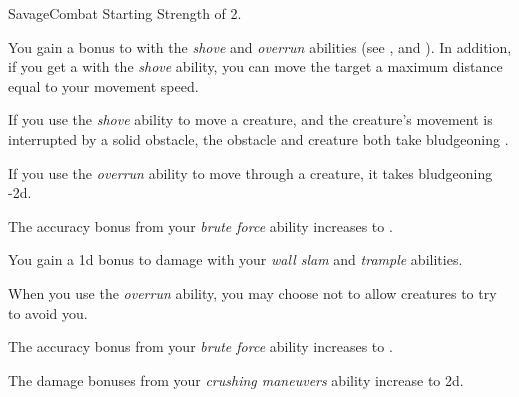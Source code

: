     \begin{feat}{Savage}{Combat}
        \featpre Starting Strength of 2.

         You gain a  bonus to  with the \textit{shove} and \textit{overrun} abilities (see , and ).
        In addition, if you get a  with the \textit{shove} ability, you can move the target a maximum distance equal to your movement speed.

         If you use the \textit{shove} ability to move a creature, and the creature's movement is interrupted by a solid obstacle, the obstacle and creature both take bludgeoning .

         If you use the \textit{overrun} ability to move through a creature, it takes bludgeoning  -2d.

         The accuracy bonus from your \textit{brute force} ability increases to .

         You gain a \plus1d bonus to damage with your \textit{wall slam} and \textit{trample} abilities.

         When you use the \textit{overrun} ability, you may choose not to allow creatures to try to avoid you.

         The accuracy bonus from your \textit{brute force} ability increases to .

         The damage bonuses from your \textit{crushing maneuvers} ability increase to \plus2d.
    \end{feat}

